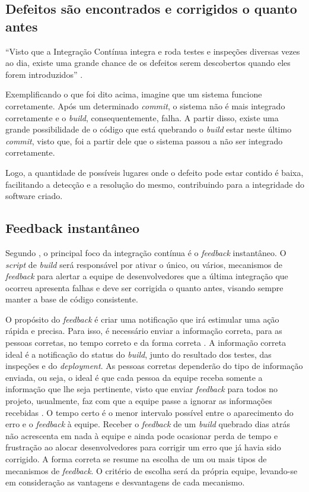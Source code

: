\subsection{Defeitos são encontrados e corrigidos o quanto antes}

``Visto que a Integração Contínua integra e roda testes e inspeções diversas vezes ao dia, existe uma grande chance de os defeitos serem descobertos quando eles forem introduzidos'' \cite{DUVALL}.

Exemplificando o que foi dito acima, imagine que um sistema funcione corretamente. Após um determinado \textit{commit}, o sistema não é mais integrado corretamente e o \textit{build}, consequentemente, falha. A partir disso, existe uma grande possibilidade de o código que está quebrando o \textit{build} estar neste último \textit{commit}, visto que, foi a partir dele que o sistema passou a não ser integrado corretamente.

Logo, a quantidade de possíveis lugares onde o defeito pode estar contido é baixa, facilitando a detecção e a resolução do mesmo, contribuindo para a integridade do software criado.

\subsection{Feedback instantâneo}

Segundo , o principal foco da integração contínua é o \textit{feedback} instantâneo. O \textit{script} de \textit{build} será responsável por ativar o único, ou vários, mecanismos de \textit{feedback} para alertar a equipe de desenvolvedores que a última integração que ocorreu apresenta falhas e deve ser corrigida o quanto antes, visando sempre manter a base de código consistente.

O propósito do \textit{feedback} é criar uma notificação que irá estimular uma ação rápida e precisa. Para isso, é necessário enviar a informação correta, para as pessoas corretas, no tempo correto e da forma correta \cite{DUVALL}. A informação correta ideal é a notificação do status do \textit{build}, junto do resultado dos testes, das inspeções e do \textit{deployment}. As pessoas corretas dependerão do tipo de informação enviada, ou seja, o ideal é que cada pessoa da equipe receba somente a informação que lhe seja pertinente, visto que enviar \textit{feedback} para todos no projeto, usualmente, faz com que a equipe passe a ignorar as informações recebidas \cite{DUVALL}. O tempo certo é o menor intervalo possível entre o aparecimento do erro e o \textit{feedback} à equipe. Receber o \textit{feedback} de um \textit{build} quebrado dias atrás não acrescenta em nada à equipe e ainda pode ocasionar perda de tempo e frustração ao alocar desenvolvedores para corrigir um erro que já havia sido corrigido. A forma correta se resume na escolha de um ou mais tipos de mecanismos de \textit{feedback}. O critério de escolha será da própria equipe, levando-se em consideração as vantagens e desvantagens de cada mecanismo.


